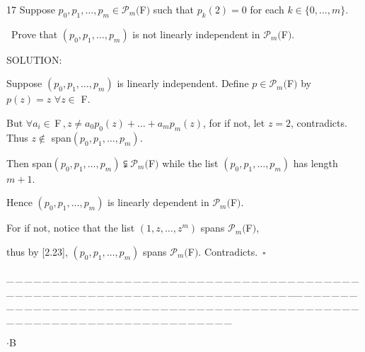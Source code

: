 \documentclass[a4paper, 11pt, UTF8]{article}
\def\Po{\mathcal{P}}
\def\Fbf{$\,{\timesbf F}\,$}
\begin{document}
\begin{large}
{\timesbf\Large 17} {\timessl\Large 
Suppose $p_0,p_1,\dots,p_m\in\Po_m(${\timesbf F}$)$ such that $p_k(2)=0$ for each $k\in\{0,\dots,m\}$.}\par\quad\,
{\timessl\Large Prove that $(p_0,p_1,\dots,p_m)$ is not linearly independent in $\Po_m(${\timesbf F}$)$.
}\par
{\timesbf S\footnotesize{OLUTION:}}\par\quad
Suppose $(p_0,p_1,\dots,p_m)$ is linearly independent. Define $p\in\Po_m(${\timesbf F}$)$ by $p(z)=z\,\,\forall z\in$ {\timesbf F}.\par\quad
But $\forall a_i\in\Fbf,z\neq a_0 p_0(z)+\dots+a_m p_m(z)$, for if not, let $z=2$, contradicts.
Thus $z\not\in$ span$(p_0,p_1,\dots,p_m)$.\par\quad
Then span$(p_0,p_1,\dots,p_m)\subsetneqq\Po_m(${\timesbf F}$)$ while the list $(p_0,p_1,\dots,p_m)$ has length $m+1$.\par\quad
Hence $(p_0,p_1,\dots,p_m)$ is linearly dependent in $\Po_m(${\timesbf F}$)$.\par\quad
For if not, notice that the list $(1,z,\dots,z^m)$ spans $\Po_m(${\timesbf F}$)$,\par\qquad
thus by [2.23], $(p_0,p_1,\dots,p_m)$ spans $\Po_m(${\timesbf F}$)$. Contradicts.$\,\,\,\square$\par
{\tiny \_\,\_\,\_\,\_\,\_\,\_\,\_\,\_\,\_\,\_\,\_\,\_\,\_\,\_\,\_\,\_\,\_\,\_\,\_\,\_\,\_\,\_\,\_\,\_\,\_\,\_\,\_\,\_\,\_\,\_\,\_\,\_\,\_\,\_\,\_\,\_\,\_\,\_\,\_\,\_\,\_\,\_\,\_\,\_\,\_\,\_\,\_\,\_\,\_\,\_\,\_\,\_\,\_\,\_\,\_\,\_\,\_\,\_\,\_\,\_\,\_\,\_\,\_\,\_\,\_\,\_\,\_\,\_\,\_\,\_\,\_\_\,\_\,\_\,\_\,\_\,\_\,\_\,\_\,\_\,\_\,\_\,\_\,\_\,\_\,\_\,\_\,\_\,\_\,\_\,\_\,\_\,\_\,\_\,\_\,\_\,\_\,\_\,\_\,\_\,\_\,\_\,\_\,\_\,\_\,\_\,\_\,\_\,\_\,\_\,\_\,\_\,\_\,\_\,\_\,\_\,\_\,\_\,\_\,\_\,\_\,\_\,\_\,\_\,\_\,\_\,\_\,\_\,\_\,\_\,\_\,\_\,\_\,\_\,\_\,\_\,\_\,\_\,\_\,\_\,\_\,\_}\par
{}\par

{\huge{}$\cdot$B} %


\end{large}
\end{document}

